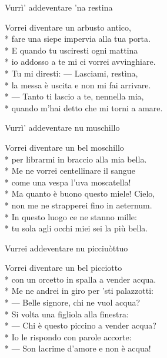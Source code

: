 \documentclass[11pt]{book}
\begin{document}
\begin{poem}{Vurrì’ addeventare ’na restina}{}
\settowidth{\versewidth}{Io addosso a te mi ci vorrei avvinghiare}
\begin{altverse}
Vorrei diventare un arbusto antico,\\*
fare una siepe impervia alla tua porta.\\*
E quando tu usciresti ogni mattina\\*
io addosso a te mi ci vorrei avvinghiare.\\*
Tu mi diresti: — Lasciami, restìna,\\*
la messa è uscita e non mi fai arrivare.\\*
— Tanto ti lascio a te, nennella mia,\\*
quando m’hai detto che mi torni a amare.
\end{altverse}
\end{poem}

\begin{poem}{Vurrì’ addeventare nu muschillo}{}
\settowidth{\versewidth}{Tu sola agli occhi miei sei la più bella.}
\begin{altverse}
Vorrei diventare un bel moschillo\\*
per librarmi in braccio alla mia bella.\\*
Me ne vorrei centellinare il sangue\\*
come una vespa l’uva moscatella!\\*
Ma quanto è buono questo miele! Cielo,\\*
non me ne strapperei fino in aeternum.\\*
In questo luogo ce ne stanno mille:\\*
tu sola agli occhi miei sei la più bella.
\end{altverse}
\end{poem}

\begin{poem}{Vurrei addeventare nu picciuòttuo}{}
\settowidth{\versewidth}{Me ne andrei in giro per ’sti palazzotti}
\begin{altverse}
Vorrei diventare un bel picciotto\\*
con un orcetto in spalla a vender acqua.\\*
Me ne andrei in giro per ’sti palazzotti:\\*
— Belle signore, chi ne vuol acqua?\\*
Si volta una figliola alla finestra:\\*
— Chi è questo piccino a vender acqua?\\*
Io le rispondo con parole accorte:\\*
— Son lacrime d’amore e non è acqua!
\end{altverse}
\end{poem}
\end{document}
